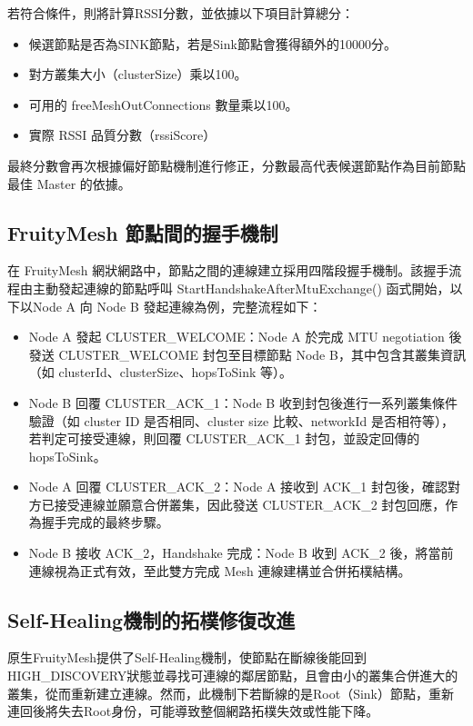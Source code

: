 \begin{ZhChapter}
若符合條件，則將計算RSSI分數，並依據以下項目計算總分：

\begin{itemize}
    \item 候選節點是否為SINK節點，若是Sink節點會獲得額外的10000分。
    \item 對方叢集大小（clusterSize）乘以100。
    \item 可用的 freeMeshOutConnections 數量乘以100。
    \item 實際 RSSI 品質分數（rssiScore）
\end{itemize}

最終分數會再次根據偏好節點機制進行修正，分數最高代表候選節點作為目前節點最佳 Master 的依據。

\subsection{FruityMesh 節點間的握手機制}
在 FruityMesh 網狀網路中，節點之間的連線建立採用四階段握手機制。該握手流程由主動發起連線的節點呼叫 StartHandshakeAfterMtuExchange() 函式開始，以下以Node A 向 Node B 發起連線為例，完整流程如下：
\begin{itemize}
    \item Node A 發起 CLUSTER\_WELCOME：Node A 於完成 MTU negotiation 後發送 CLUSTER\_WELCOME 封包至目標節點 Node B，其中包含其叢集資訊（如 clusterId、clusterSize、hopsToSink 等）。
    \item Node B 回覆 CLUSTER\_ACK\_1：Node B 收到封包後進行一系列叢集條件驗證（如 cluster ID 是否相同、cluster size 比較、networkId 是否相符等），若判定可接受連線，則回覆 CLUSTER\_ACK\_1 封包，並設定回傳的 hopsToSink。
    \item Node A 回覆 CLUSTER\_ACK\_2：Node A 接收到 ACK\_1 封包後，確認對方已接受連線並願意合併叢集，因此發送 CLUSTER\_ACK\_2 封包回應，作為握手完成的最終步驟。
    \item Node B 接收 ACK\_2，Handshake 完成：Node B 收到 ACK\_2 後，將當前連線視為正式有效，至此雙方完成 Mesh 連線建構並合併拓樸結構。
\end{itemize}

\subsection{Self-Healing機制的拓樸修復改進}

原生FruityMesh提供了Self-Healing機制，使節點在斷線後能回到HIGH\_DISCOVERY狀態並尋找可連線的鄰居節點，且會由小的叢集合併進大的叢集，從而重新建立連線。然而，此機制下若斷線的是Root（Sink）節點，重新連回後將失去Root身份，可能導致整個網路拓樸失效或性能下降。


\end{ZhChapter}
